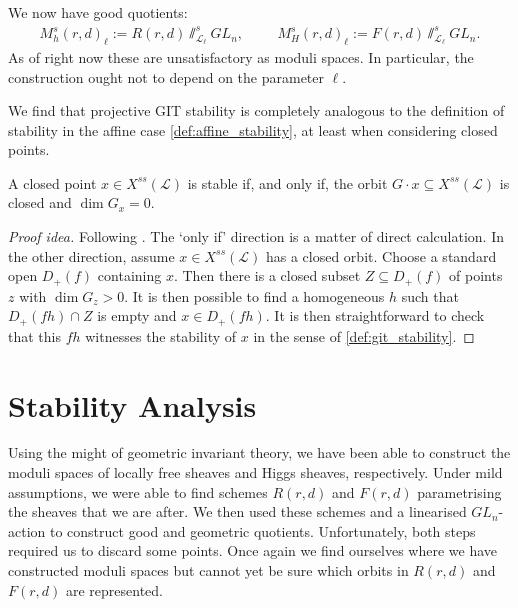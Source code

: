 \documentclass[12pt]{ociamthesis}  %
\begin{document}
\begin{example}
  We now have good quotients:
  \begin{align*}
    M^{s}_h(r,d)_\ell := R(r,d)\sslash^s_{\mathscr L_\ell} GL_n, \hspace{1cm}
    M^{s}_H(r,d)_\ell := F(r,d)\sslash^s_{\mathscr L_\ell} GL_n.
  \end{align*}
  As of right now these are unsatisfactory as moduli spaces. In particular,
  the construction ought not to depend on the parameter $\ell$.
\end{example}

We find that projective GIT stability is completely analogous to the definition
of stability in the affine case \ref{def:affine_stability}, at least when
considering closed points.

\begin{lemma}
  A closed point $x\in X^{ss}(\mathscr L)$ is stable if, and only if, the orbit
  $G\cdot x\subseteq X^{ss}(\mathscr L)$ is closed and $\dim G_x = 0$.
  \begin{proof}[Proof idea]
    Following \cite[Lemma 5.9]{hoskins2016}.
    The `only if' direction is a matter of direct calculation.
    In the other direction, assume $x\in X^{ss}(\mathscr L)$ has a
    closed orbit. Choose a standard open $D_+(f)$ containing
    $x$. Then there is a closed subset $Z\subseteq D_+(f)$ of
    points $z$ with $\dim G_z > 0$. It is then possible to find
    a homogeneous $h$ such that $D_+(fh)\cap Z$ is empty and
    $x\in D_+(fh)$. It is then straightforward to check that this
    $fh$ witnesses the stability of $x$ in the sense of
    \ref{def:git_stability}.
  \end{proof}
\end{lemma}

\section{Stability Analysis}

Using the might of geometric invariant theory, we have been able
to construct the moduli spaces of locally free sheaves and Higgs
sheaves, respectively. Under mild assumptions, we were able to
find schemes $R(r,d)$ and $F(r,d)$ parametrising the sheaves
that we are after. We then used these schemes and a linearised
$GL_n$-action to construct good and geometric quotients.
Unfortunately, both steps required us to discard some points.
Once again we find ourselves where we have constructed moduli spaces
but cannot yet be sure which orbits in $R(r,d)$ and $F(r,d)$
are represented.
\end{document}
